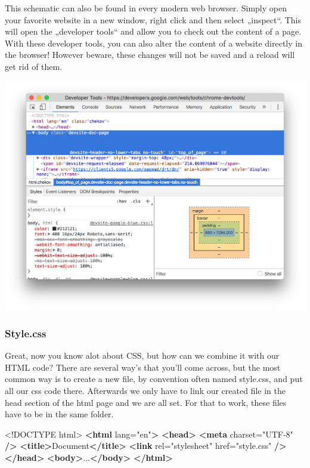 \documentclass[
]{article}
\newenvironment{Shaded}{\begin{snugshade}}{\end{snugshade}}
\newcommand{\DataTypeTok}[1]{\textcolor[rgb]{0.13,0.29,0.53}{#1}}
\newcommand{\KeywordTok}[1]{\textcolor[rgb]{0.13,0.29,0.53}{\textbf{#1}}}
\newcommand{\NormalTok}[1]{#1}
\newcommand{\OtherTok}[1]{\textcolor[rgb]{0.56,0.35,0.01}{#1}}
\newcommand{\StringTok}[1]{\textcolor[rgb]{0.31,0.60,0.02}{#1}}
\begin{document}
This schematic can also be found in every modern web browser. Simply open your favorite website in a new window, right click and then select „inspect``. This will open the „developer tools`` and allow you to check out the content of a page. With these developer tools, you can also alter the content of a website directly in the browser! However beware, these changes will not be saved and a reload will get rid of them.

\includegraphics{docs/assets/ta-website.png}

\hypertarget{style.css}{%
\subsubsection*{Style.css}\label{style.css}}

Great, now you know alot about CSS, but how can we combine it with our HTML code? There are several way's that you'll come across, but the most common way is to create a new file, by convention often named style.css, and put all our css code there. Afterwards we only have to link our created file in the head section of the html page and we are all set. For that to work, these files have to be in the same folder.

\begin{Shaded}
\begin{Highlighting}[]
\DataTypeTok{\textless{}!DOCTYPE }\NormalTok{html}\DataTypeTok{\textgreater{}}
\KeywordTok{\textless{}html}\OtherTok{ lang=}\StringTok{"en"}\KeywordTok{\textgreater{}}
  \KeywordTok{\textless{}head\textgreater{}}
    \KeywordTok{\textless{}meta}\OtherTok{ charset=}\StringTok{"UTF{-}8"} \KeywordTok{/\textgreater{}}
    \KeywordTok{\textless{}title\textgreater{}}\NormalTok{Document}\KeywordTok{\textless{}/title\textgreater{}}
    \KeywordTok{\textless{}link}\OtherTok{ rel=}\StringTok{"stylesheet"}\OtherTok{ href=}\StringTok{"style.css"} \KeywordTok{/\textgreater{}}
  \KeywordTok{\textless{}/head\textgreater{}}
  \KeywordTok{\textless{}body\textgreater{}}\NormalTok{...}\KeywordTok{\textless{}/body\textgreater{}}
\KeywordTok{\textless{}/html\textgreater{}}
\end{Highlighting}
\end{Shaded}
\end{document}
